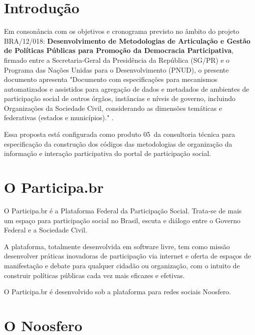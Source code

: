 \documentclass[12pt]{article}
\newcommand{\ProductNumber}{05}
\newcommand{\ProductDescription}{"Documento com especificações para mecanismos
  automatizados e assistidos para agregação de dados e metadados de ambientes
  de participação social de outros órgãos, instâncias e níveis de governo,
  incluindo Organizações da Sociedade Civil, considerando as dimensões
  temáticas e federativas (estados e municípios)."
}
\newcommand{\PalavrasChave}{agregação, api, cidade democrática, interoperabilidade}
\begin{document}




\tableofcontents
\newpage

\begin{abstract}
Documento com proposta de interoperabilidade entre o Participa.br e o Cidade
Democrática, proposta de API e funcionalidades para moderação de conteúdo
possibilitando agregação assistida pelos adminisitradores do ambiente. \\

{\bf Palavras-chave:} \PalavrasChave.
\end{abstract}
\newpage

\section{Introdução}

Em consonância com os objetivos e cronograma previsto no âmbito do
projeto BRA/12/018:
\textbf{Desenvolvimento de Metodologias de Articulação e Gestão de
Políticas Públicas para Promoção da Democracia Participativa},
firmado entre a Secretaria-Geral da Presidência da República
(SG/PR) e o Programa das Nações Unidas para o Desenvolvimento (PNUD),
o presente documento apresenta \ProductDescription.

Essa proposta está configurada como produto \ProductNumber~da consultoria técnica
para especificação da construção dos códigos das metodologias de
organização da informação e interação participativa do portal de
participação social.

\section{O Participa.br}

O Participa.br é a Plataforma Federal da Participação Social. Trata-se de mais
um espaço para participação social no Brasil, escuta e diálogo entre o Governo
Federal e a Sociedade Civil. 

A plataforma, totalmente desenvolvida em software livre, tem como missão
desenvolver práticas inovadoras de participação via internet e oferta de
espaços de manifestação e debate para qualquer cidadão ou organização, com o
intuito de construir políticas públicas cada vez mais eficazes e efetivas.

O Participa.br é desenvolvido sob a plataforma para redes sociais Noosfero.

\section{O Noosfero}
\end{document}
